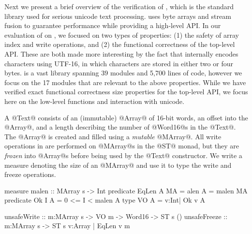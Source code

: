 Next %
we present a brief overview of the verification of \libtext, which 
is the standard library used for serious unicode text processing. 
\libtext uses byte arrays and stream fusion to guarantee 
performance while providing a high-level API.
In our evaluation of \toolname on \libtext,%
we focused on two types of properties: 
(1) the safety of array index and write operations, and 
(2) the functional correctness of the top-level API.
%
These are both made more interesting by the fact that 
\libtext internally encodes characters using UTF-16, 
in which characters are stored in either two or four bytes.
%
\libtext is a vast library spanning 39 modules and 5,700 lines of
code, however we focus on the 17 modules that are relevant
to the above properties.
%
While we have verified exact functional correctness size properties
for the top-level API, we focus here on the low-level functions 
and interaction with unicode.

A @Text@ consists of an (immutable) @Array@ of 16-bit words,
an offset into the @Array@, and a length describing the
number of @Word16@s in the @Text@.  
The @Array@ is created and filled using a
\emph{mutable} @MArray@. 
All write operations in \libtext are performed on @MArray@s 
in the @ST@ monad, but they are \emph{frozen} into @Array@s
before being used by the @Text@ constructor.
%
We write a measure denoting the size of an @MArray@ and use
it to type the write and freeze operations.
%
\begin{code}
  measure malen       :: MArray s -> Int
  predicate EqLen A MA = alen A = malen MA
  predicate Ok I A     = 0 <= I < malen A
  type VO A            = {v:Int| Ok v A} 
  
  unsafeWrite  :: m:MArray s
               -> VO m -> Word16 -> ST s ()
  unsafeFreeze :: m:MArray s
               -> ST s {v:Array | EqLen v m}
\end{code}

